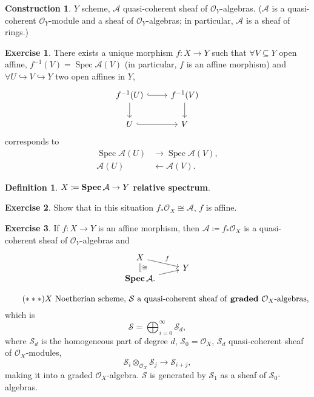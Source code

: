 \documentclass[12pt]{article}
\DeclareMathOperator{\Spec}{Spec}
\DeclareMathOperator{\relSpec}{\textnormal{\textbf{Spec}}}
\theoremstyle{definition}
\newtheorem*{definition}{Definition}
\newtheorem*{exercise}{Exercise}
\newtheorem*{construction}{Construction}
\theoremstyle{remark}
\begin{document}
\begin{construction}
$Y$ scheme, $\mathcal{A}$ quasi-coherent sheaf of $\mathcal{O}_Y$-algebras. ($\mathcal{A}$ is a quasi-coherent $\mathcal{O}_Y$-module and a sheaf of $\mathcal{O}_Y$-algebras; in particular, $\mathcal{A}$ is a sheaf of rings.)

\begin{exercise}
There exists a unique morphism $f:X\rightarrow Y$ such that $\forall V\subseteq Y$ open affine, $f^{-1}(V)=\Spec\mathcal{A}(V)$ (in particular, $f$ is an affine morphism) and $\forall U\hookrightarrow V\hookrightarrow Y$ two open affines in $Y$,
\[
\begin{tikzcd}
f^{-1}(U)\arrow[r,hook]\arrow[d]&f^{-1}(V)\arrow[d]\\
U\arrow[r,hook]&V
\end{tikzcd}
\]
corresponds to
\begin{align*}
\Spec\mathcal{A}(U)&\longrightarrow\Spec\mathcal{A}(V),\\
\mathcal{A}(U)&\longleftarrow\mathcal{A}(V).
\end{align*}
\end{exercise}

\begin{definition}
$X\coloneqq\relSpec\mathcal{A}\rightarrow Y$ \textbf{relative spectrum}.
\end{definition}

\begin{exercise}
Show that in this situation $f_*\mathcal{O}_X\cong\mathcal{A}$, $f$ is affine.
\end{exercise}

\begin{exercise}
If $f:X\rightarrow Y$ is an affine morphism, then $\mathcal{A}\coloneqq f_*\mathcal{O}_X$ is a quasi-coherent sheaf of $\mathcal{O}_Y$-algebras and
\[
\begin{tikzcd}
X\arrow[rd,"f"]\arrow[dd,-,double equal sign distance,double,"\cong"]\\[-0.7cm]
&Y\\[-0.7cm]
\relSpec\mathcal{A}.\arrow[ru]
\end{tikzcd}
\]
\end{exercise}
\end{construction}

\begin{equation}\tag{$***$}\label{condition_algebra}
X\text{ Noetherian scheme, }\mathcal{S}\text{ a quasi-coherent sheaf of \textbf{graded} }\mathcal{O}_X\text{-algebras},
\end{equation}
which is
\[\mathcal{S}=\bigoplus_{i=0}^{\infty}\mathcal{S}_d,\]
where $\mathcal{S}_d$ is the homogeneous part of degree $d$, $\mathcal{S}_0=\mathcal{O}_X$, $\mathcal{S}_d$ quasi-coherent sheaf of $\mathcal{O}_X$-modules,
\[\mathcal{S}_i\otimes_{\mathcal{O}_X}\mathcal{S}_j\longrightarrow\mathcal{S}_{i+j},\]
making it into a graded $\mathcal{O}_X$-algebra. $\mathcal{S}$ is generated by $\mathcal{S}_1$ as a sheaf of $\mathcal{S}_0$-algebras.
\end{document}
